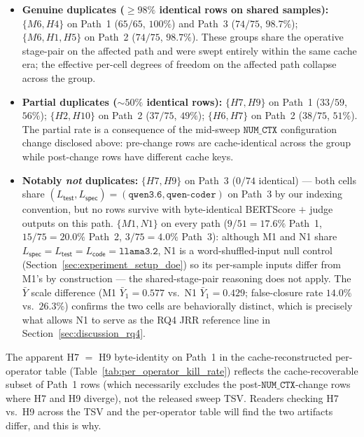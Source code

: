 \begin{itemize}
  \item \textbf{Genuine duplicates ($\geq 98\%$ identical rows on shared samples):}
    $\{M6, H4\}$ on Path~1 ($65/65$, $100\%$) and Path~3 ($74/75$, $98.7\%$);
    $\{M6, H1, H5\}$ on Path~2 ($74/75$, $98.7\%$).
    These groups share the operative stage-pair on the affected path
    and were swept entirely within the same cache era; the effective
    per-cell degrees of freedom on the affected path collapse across
    the group.
  \item \textbf{Partial duplicates ($\sim$$50\%$ identical rows):}
    $\{H7, H9\}$ on Path~1 ($33/59$, $56\%$);
    $\{H2, H10\}$ on Path~2 ($37/75$, $49\%$);
    $\{H6, H7\}$ on Path~2 ($38/75$, $51\%$).
    The partial rate is a consequence of the mid-sweep
    $\texttt{NUM\_CTX}$ configuration change disclosed above:
    pre-change rows are cache-identical across the group while
    post-change rows have different cache keys.
  \item \textbf{Notably \emph{not} duplicates:}
    $\{H7, H9\}$ on Path~3 ($0/74$ identical) --- both cells share
    $(L_{\textsf{test}}, L_{\textsf{spec}}) = (\texttt{qwen3.6}, \texttt{qwen-coder})$
    on Path~3 by our indexing convention, but no rows survive with
    byte-identical BERTScore $+$ judge outputs on this path.
    $\{M1, N1\}$ on every path ($9/51 = 17.6\%$ Path~1, $15/75 = 20.0\%$
    Path~2, $3/75 = 4.0\%$ Path~3): although M1 and N1 share
    $L_{\textsf{spec}} = L_{\textsf{test}} = L_{\textsf{code}} = \texttt{llama3.2}$,
    N1 is a word-shuffled-input null control
    (Section~\ref{sec:experiment_setup_doe}) so its per-sample inputs
    differ from M1's by construction --- the shared-stage-pair
    reasoning does not apply. The $\bar{Y}$ scale difference (M1
    $\bar{Y}_1 = 0.577$ vs.\ N1 $\bar{Y}_1 = 0.429$; false-closure
    rate $14.0\%$ vs.\ $26.3\%$) confirms the two cells are
    behaviorally distinct, which is precisely what allows N1 to serve
    as the RQ4 JRR reference line in Section~\ref{sec:discussion_rq4}.
\end{itemize}

The apparent H7 $=$ H9 byte-identity on Path~1 in the cache-reconstructed
per-operator table (Table~\ref{tab:per_operator_kill_rate}) reflects the
cache-recoverable subset of Path~1 rows (which necessarily excludes the
post-$\texttt{NUM\_CTX}$-change rows where H7 and H9 diverge), not the
released sweep TSV. Readers checking H7 vs.\ H9 across the TSV and the
per-operator table will find the two artifacts differ, and this is why.

